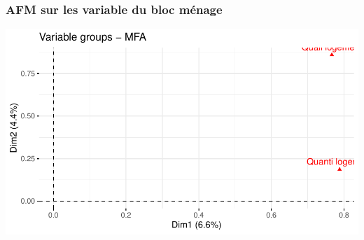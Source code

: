 \documentclass[11pt,a4paper, x11names]{article}\usepackage[]{graphicx}\usepackage[]{color}
\makeatletter
\def\maxwidth{ %
  \ifdim\Gin@nat@width>\linewidth
    \linewidth
  \else
    \Gin@nat@width
  \fi
}
\newenvironment{knitrout}{}{} %
\makeatother
\begin{document}
\subsubsection{AFM sur les variable du bloc ménage}
\begin{minipage}{0.49\linewidth}
\begin{mdframed}
\begin{knitrout}
\color{fgcolor}
\includegraphics[width=\maxwidth]{figure/unnamed-chunk-15-1} 
\end{knitrout}

\end{mdframed}
\end{minipage}

\end{document}

